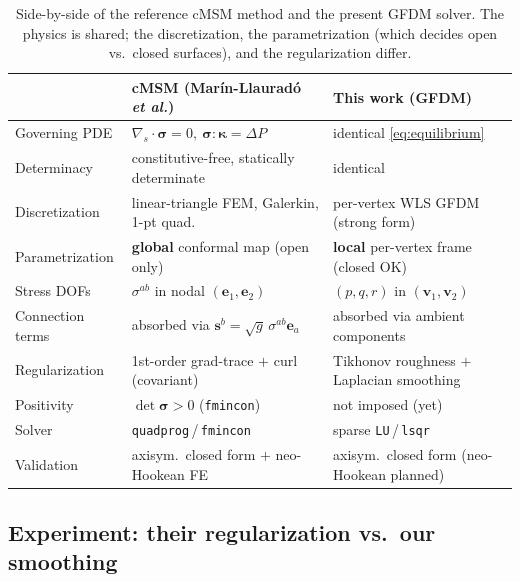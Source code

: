 \documentclass[11pt]{article}
\newcommand{\vv}[1]{\bm{#1}}
\newcommand{\divs}{\nabla_{\!s}\!\cdot}
\begin{document}
\begin{table}[h]\centering\small
\begin{tabular}{lll}
\toprule
 & cMSM (Mar\'in-Llaurad\'o \emph{et al.}) & This work (GFDM) \\
\midrule
Governing PDE     & $\divs\bm\sigma=0,\ \bm\sigma:\bm\kappa=\Delta P$ & identical \eqref{eq:equilibrium} \\
Determinacy       & constitutive-free, statically determinate & identical \\
Discretization    & linear-triangle FEM, Galerkin, 1-pt quad. & per-vertex WLS GFDM (strong form) \\
Parametrization   & \textbf{global} conformal map (open only) & \textbf{local} per-vertex frame (closed OK) \\
Stress DOFs       & $\sigma^{ab}$ in nodal $(\vv e_1,\vv e_2)$ & $(p,q,r)$ in $(\vv v_1,\vv v_2)$ \\
Connection terms  & absorbed via $\vv s^b=\sqrt g\,\sigma^{ab}\vv e_a$ & absorbed via ambient components \\
Regularization    & 1st-order grad-trace $+$ curl (covariant) & Tikhonov roughness $+$ Laplacian smoothing \\
Positivity        & $\det\bm\sigma>0$ (\texttt{fmincon}) & not imposed (yet) \\
Solver            & \texttt{quadprog}\,/\,\texttt{fmincon} & sparse \texttt{LU}\,/\,\texttt{lsqr} \\
Validation        & axisym.\ closed form $+$ neo-Hookean FE & axisym.\ closed form (neo-Hookean planned) \\
\bottomrule
\end{tabular}
\caption{Side-by-side of the reference cMSM method and the present GFDM solver. The physics is
shared; the discretization, the parametrization (which decides open vs.\ closed surfaces), and
the regularization differ.}
\label{tab:cmsm}
\end{table}

\subsection{Experiment: their regularization vs.\ our smoothing}\label{sec:regcompare}
\end{document}
